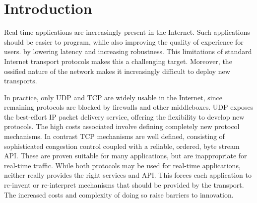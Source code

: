 \documentclass[10pt]{sig-alternate-05-2015}
\begin{document}

\printccsdesc

\section{Introduction}

%

Real-time applications are increasingly
present in the Internet.
Such applications should be easier to program, while also improving
the quality of experience for users.
by lowering latency and increasing robustness.
This limitations of standard Internet transport protocols makes this a
challenging target. Moreover, the ossified nature of the network makes
it increasingly difficult to deploy new transports.


In practice, only UDP and TCP are widely usable in the Internet,
since remaining protocols are blocked by firewalls and other
middleboxes. UDP exposes the best-effort IP packet delivery service,
offering the flexibility to develop new protocols. The high costs
associated involve defining completely new protocol mechanisms. In
contrast TCP mechanisms are well defined, consisting of sophisticated
congestion control coupled with a reliable, ordered, byte stream API.
These are proven suitable for many applications, but are inappropriate
for real-time traffic. While both protocols may be used for real-time
applications, neither really provides the right services and API. This
forces each application to re-invent or re-interpret mechanisms that
should be provided by the transport. The increased costs and
complexity of doing so raise barriers to innovation.
\end{document}
